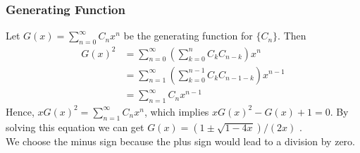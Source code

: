 \documentclass{beamer}
\begin{document}
\begin{frame}
    \frametitle{Generating Function}
    \hh Let $G(x)=\sum_{n=0}^\infty C_n x^n$ be the generating function for $\{C_n\}$. Then
    \begin{equation*}
        \begin{aligned}
            G(x)^2&=\sum_{n=0}^\infty (\sum_{k=0}^n C_k C_{n-k})x^n\\
            &= \sum_{n=1}^\infty (\sum_{k=0}^{n-1} C_k C_{n-1-k})x^{n-1}\\
            &=\sum_{n=1}^\infty C_n x^{n-1}
        \end{aligned}
    \end{equation*}
    \hh Hence, $xG(x)^2=\sum_{n=1}^\infty C_n x^n$, 
    which implies $x G(x)^2 - G(x) +1 =0$. 
    By solving this equation we can get $G(x)=(1\pm\sqrt{1-4x})/(2x)$ . \\ 
    \hh We choose the minus sign because the plus 
    sign would lead to a division by zero.
\end{frame}
\end{document}
